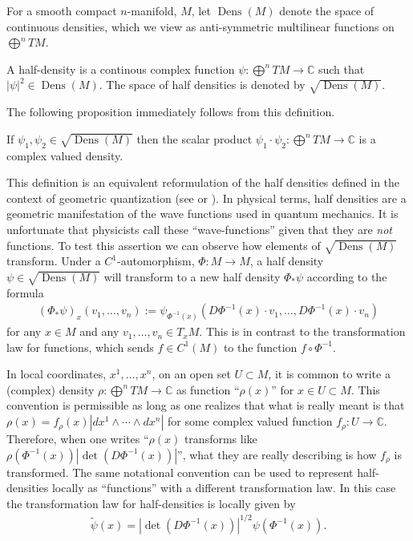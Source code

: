 \documentclass[final,leqno]{siamltex1213}
\DeclareMathOperator{\Dens}{Dens}
\begin{document}
For a smooth compact $n$-manifold, $M$, let $\Dens(M)$ denote the space of continuous densities, which we view as anti-symmetric multilinear functions on $\bigoplus^n TM$.
\begin{definition}\label{def:half density}
	A half-density is a continous complex function $\psi : \bigoplus^n TM \to \mathbb{C}$
	such that $| \psi |^{2} \in \Dens(M)$.
	The space of half densities is denoted by $\sqrt{\Dens(M)}$.
\end{definition}

The following proposition immediately follows from this definition.
\begin{proposition} \label{prop:half densities}
	If $\psi_{1}, \psi_{2} \in \sqrt{\Dens(M)}$ then the scalar product $\psi_{1} \cdot \psi_{2} : \bigoplus^{n} TM \to \mathbb{C}$ is a complex valued density. 
\end{proposition}

This definition is an equivalent reformulation of the half densities defined in the context of geometric quantization (see \cite[Chapter 4]{GuilleminSternberg1970} or \cite[Appendix A]{BatesWeinstein1997}).
In physical terms, half densities are a geometric manifestation of the wave functions used in quantum mechanics.
It is unfortunate that physicists call these ``wave-functions'' given that they are \emph{not} functions.
To test this assertion we can observe how elements of $\sqrt{\Dens(M)}$ transform.
Under a $C^{1}$-automorphism, $\Phi: M \to M$,
a half density $\psi \in \sqrt{ \Dens(M) }$ will transform to a new half density $\Phi_{*}\psi$ according to the formula
\begin{align}
	(\Phi_{*}\psi)_{x}(v_{1},\dots,v_{n}) := \psi_{ \Phi^{-1}(x) } ( D\Phi^{-1}(x) \cdot v_{1} , \dots , D\Phi^{-1}(x) \cdot v_{n} ) \label{eq:transformation law}
\end{align}
for any $x \in M$ and any $v_{1}, \dots , v_{n} \in T_{x}M$.
This is in contrast to the transformation law for functions, which sends $f \in C^{1}(M)$ to the function $f \circ \Phi^{-1}$. 

In local coordinates, $x^{1},\dots,x^{n}$, on an open set $U \subset M$, it is common to write a (complex) density $\rho: \bigoplus^{n}TM \to \mathbb{C}$ as function ``$\rho(x)$'' for $x \in U \subset M$.
This convention is permissible as long as one realizes that what is really meant is that $\rho(x) = f_{\rho}(x) | dx^{1} \wedge \cdots \wedge dx^{n} |$ for some complex valued function $f_{\rho}:U \to \mathbb{C}$.
Therefore, when one writes  ``$\rho(x)$ transforms like $\rho( \Phi^{-1}(x)) \left| \det( D \Phi^{-1}(x) ) \right|$'', what they are really describing is how $f_{\rho}$ is transformed.
The same notational convention can be used to represent half-densities locally as ``functions'' with a different transformation law.
In this case the transformation law for half-densities is locally given by
\begin{align}
	\tilde{\psi}(x) = \left| \det \left( D\Phi^{-1} (x) \right) \right|^{1/2} \psi \left( \Phi^{-1}(x) \right). \label{eq:local transformation law}
\end{align}
\end{document}
